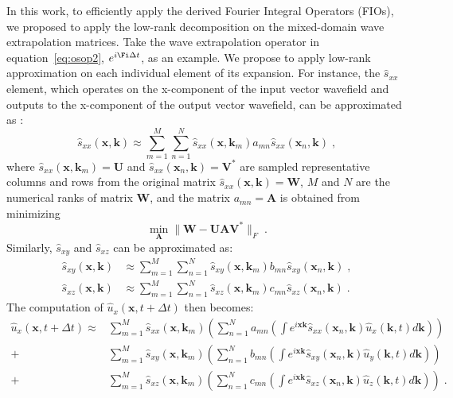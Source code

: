 In this work, to efficiently apply the derived Fourier Integral Operators (FIOs), we proposed to apply the low-rank decomposition \cite[]{lowrank} on the mixed-domain wave extrapolation matrices. Take the wave extrapolation operator in equation~\ref{eq:osop2}, $e^{i\Fi \Delta t}$, as an example. We propose to apply low-rank approximation on each individual element of its expansion. For instance, the $\hat{s}_{xx}$ element, which operates on the x-component of the input vector wavefield and outputs to the x-component of the output vector wavefield, can be approximated as \cite[]{lowrank}:
\begin{equation}
  \label{eq:lra}
  \hat{s}_{xx}(\mathbf{x},\mathbf{k})  \approx \sum\limits_{m=1}^M \sum\limits_{n=1}^N \hat{s}_{xx}(\mathbf{x},\mathbf{k}_m) a_{mn} \hat{s}_{xx}(\mathbf{x}_n,\mathbf{k})\;,
\end{equation}
where $\hat{s}_{xx}(\mathbf{x},\mathbf{k}_m)=\mathbf{U}$ and $\hat{s}_{xx}(\mathbf{x}_n,\mathbf{k})=\mathbf{V}^*$ are sampled representative columns and rows from the original matrix $\hat{s}_{xx}(\mathbf{x},\mathbf{k})=\mathbf{W}$, $M$ and $N$ are the numerical ranks of matrix $\mathbf{W}$, and the matrix $a_{mn}=\mathbf{A}$ is obtained from minimizing
\begin{equation}
\min_{\mathbf{A}} \lVert \mathbf{\mathbf{W} - \mathbf{U} \mathbf{A} \mathbf{V}^*} \rVert_F \;.
\end{equation}
Similarly, $\hat{s}_{xy}$ and $\hat{s}_{xz}$ can be approximated as:
\begin{eqnarray}
  \label{eq:lra2}
  \hat{s}_{xy}(\mathbf{x},\mathbf{k}) &\approx \sum\limits_{m=1}^M \sum\limits_{n=1}^N \hat{s}_{xy}(\mathbf{x},\mathbf{k}_m) b_{mn} \hat{s}_{xy}(\mathbf{x}_n,\mathbf{k})\;, \\
  \hat{s}_{xz}(\mathbf{x},\mathbf{k}) &\approx \sum\limits_{m=1}^M \sum\limits_{n=1}^N \hat{s}_{xz}(\mathbf{x},\mathbf{k}_m) c_{mn} \hat{s}_{xz}(\mathbf{x}_n,\mathbf{k})\;.
\end{eqnarray}
The computation of $\hat{u}_x(\mathbf{x},t+\Delta t)$ then becomes:
\begin{eqnarray}
    \label{eq:timestep}
    \hat{u}_x(\mathbf{x},t+\Delta t) 
    \approx & \sum\limits_{m=1}^M \hat{s}_{xx}(\mathbf{x},\mathbf{k}_m) \left( \sum\limits_{n=1}^N a_{mn} \left(\int e^{i \mathbf{x}\mathbf{k}} \hat{s}_{xx}(\mathbf{x}_n,\mathbf{k}) \hat{u}_x(\mathbf{k},t) d\mathbf{k} \right) \right) \\ \nonumber
    +       & \sum\limits_{m=1}^M \hat{s}_{xy}(\mathbf{x},\mathbf{k}_m) \left( \sum\limits_{n=1}^N b_{mn} \left(\int e^{i \mathbf{x}\mathbf{k}} \hat{s}_{xy}(\mathbf{x}_n,\mathbf{k}) \hat{u}_y(\mathbf{k},t) d\mathbf{k} \right) \right) \\ \nonumber
    +       & \sum\limits_{m=1}^M \hat{s}_{xz}(\mathbf{x},\mathbf{k}_m) \left( \sum\limits_{n=1}^N c_{mn} \left(\int e^{i \mathbf{x}\mathbf{k}} \hat{s}_{xz}(\mathbf{x}_n,\mathbf{k}) \hat{u}_z(\mathbf{k},t) d\mathbf{k} \right) \right) \;.
\end{eqnarray}
